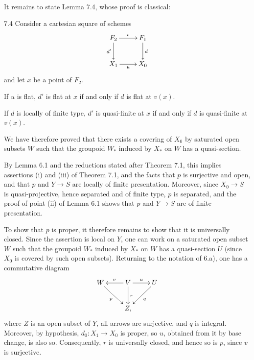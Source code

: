 It remains to state Lemma 7.4, whose proof is classical:
\begin{lemma}{7.4}\label{V.7.4}
Consider a cartesian square of schemes
\[
\xymatrix{F_2\ar[r]^v\ar[d]_{d'}&F_1\ar[d]^d\\X_1\ar[r]_u&X_0}
\]
and let $x$ be a point of $F_2$.
\begin{enumeratei}
\item If $u$ is flat, $d'$ is flat at $x$ if and only if $d$ is flat at $v(x)$.
\item If $d$ is locally of finite type, $d'$ is quasi-finite at $x$ if and only if $d$ is quasi-finite at $v(x)$.
\end{enumeratei}
\end{lemma}
We have therefore proved that there exists a covering of $X_0$ by saturated open subsets $W$ such that the groupoid $W_*$ induced by $X_*$ on $W$ has a quasi-section.

By Lemma 6.1 and the reductions stated after Theorem 7.1, this implies assertions (i) and (iii) of Theorem 7.1, and the facts that $p$ is surjective and open, and that $p$ and $Y\to S$ are locally of finite presentation. Moreover, since $X_0\to S$ is quasi-projective, hence separated and of finite type, $p$ is separated, and the proof of point (ii) of Lemma 6.1 shows that $p$ and $Y\to S$ are of finite presentation.

To show that $p$ is proper, it therefore remains to show that it is universally closed. Since the assertion is local on $Y$, one can work on a saturated open subset $W$ such that the groupoid $W_*$ induced by $X_*$ on $W$ has a quasi-section $U$ (since $X_0$ is covered by such open subsets). Returning to the notation of 6.a), one has a commutative diagram
\[
\xymatrix{W\ar[dr]_p&V\ar[l]_v\ar[r]^u\ar[d]^r&U\ar[dl]^q\\&Z,&}
\]
where $Z$ is an open subset of $Y$, all arrows are surjective, and $q$ is integral. Moreover, by hypothesis, $d_0:X_1\to X_0$ is proper, so $u$, obtained from it by base change, is also so. Consequently, $r$ is universally closed, and hence so is $p$, since $v$ is surjective.

